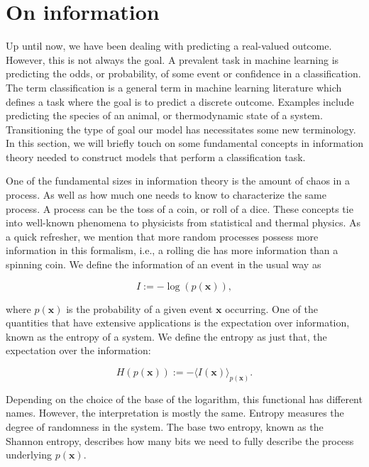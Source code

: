 
\section{On information}\label{sec:information}

Up until now, we have been dealing with predicting a real-valued outcome. However,  this is not always the goal. A prevalent task in machine learning is predicting the odds, or probability, of some event or confidence in a classification. The term classification is a general term in machine learning literature which defines a task where the goal is to predict a discrete outcome. Examples include predicting the species of an animal, or thermodynamic state of a system. Transitioning the type of goal our model has necessitates some new terminology. In this section, we will briefly touch on some fundamental concepts in information theory needed to construct models that perform a classification task.

One of the fundamental sizes in information theory is the amount of chaos in a process.  As well as how much one needs to know to characterize the same process.  A process can be the toss of a coin, or roll of a dice. These concepts tie into well-known phenomena to physicists from statistical and thermal physics. As a quick refresher, we mention that more random processes possess more information in this formalism, i.e., a rolling die has more information than a spinning coin. We define the information of an event in the usual way as 

\begin{equation}
I := -\log(p(\boldsymbol{x})),
\end{equation} 

\noindent where $p(\boldsymbol{x})$ is the probability of a given event $\boldsymbol{x}$ occurring. One of the quantities that have extensive applications is the expectation over information, known as the entropy of a system. We define the entropy as just that, the expectation over the information:

\begin{equation}
H(p(\boldsymbol{x})):= -\langle I(\boldsymbol{x}) \rangle_{p(\boldsymbol{x})}.
\end{equation}

\noindent Depending on the choice of the base of the logarithm, this functional has different names. However, the interpretation is mostly the same. Entropy measures the degree of randomness in the system. The base two entropy, known as the Shannon entropy, describes how many bits we need to fully describe the process underlying $p(\boldsymbol{x})$. 

